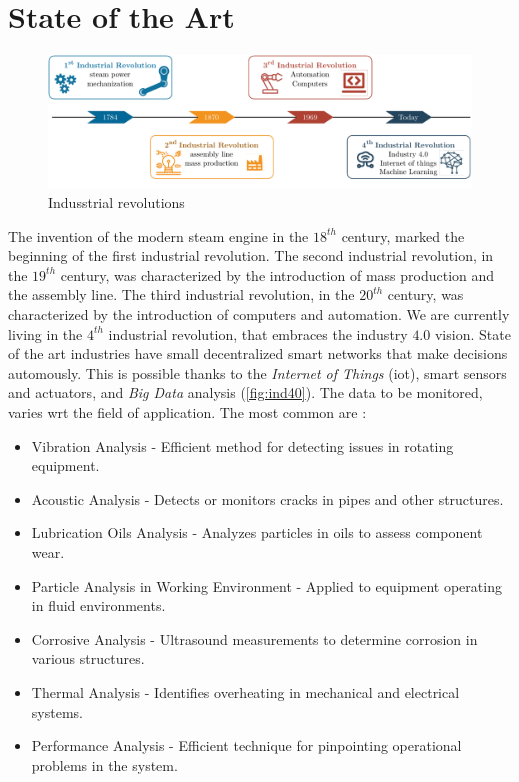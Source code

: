 \chapter{State of the Art}
\label{ch:state_of_the_art}

\begin{figure}[h]
    \centering
    \includegraphics[width=\textwidth]{images/StateArt/Industry40.pdf}
    \caption{Indusstrial revolutions}
    \label{fig:ind40}    
\end{figure}

The invention of the modern steam engine in the $18^{th}$ century, marked the beginning of the first industrial revolution. The second industrial revolution, in the $19^{th}$ century, was characterized by the introduction of mass production and the assembly line. The third industrial revolution, in the $20^{th}$ century, was characterized by the introduction of computers and automation. We are currently living in the $4^{th}$ industrial revolution, that embraces the industry $4.0$ vision. State of the art industries have small decentralized smart networks that make decisions automously. This is possible thanks to the \emph{Internet of Things} (\gls{iot}), smart sensors and actuators, and \emph{Big Data} analysis (\autoref{fig:ind40}). 
The data to be monitored, varies \gls{wrt} the field of application. The most common are \cite{State_Art_Coanda_2020}:
\begin{itemize}
    \item Vibration Analysis - Efficient method for detecting issues in rotating equipment.
    \item Acoustic Analysis - Detects or monitors cracks in pipes and other structures.
    \item Lubrication Oils Analysis - Analyzes particles in oils to assess component wear.
    \item Particle Analysis in Working Environment - Applied to equipment operating in fluid environments.
    \item Corrosive Analysis - Ultrasound measurements to determine corrosion in various structures.
    \item Thermal Analysis - Identifies overheating in mechanical and electrical systems.
    \item Performance Analysis - Efficient technique for pinpointing operational problems in the system.
\end{itemize}



